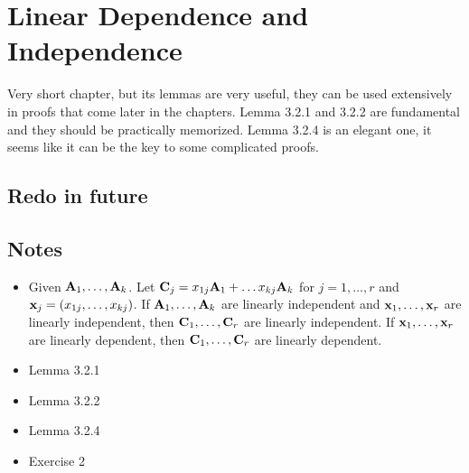 \documentclass[a4paper, oneside]{book}
\begin{document}
\chapter{Linear Dependence and Independence}
Very short chapter, but its lemmas are very useful, they can be used extensively in proofs that come later in the chapters. Lemma 3.2.1 and 3.2.2 are fundamental and they should be practically memorized. Lemma 3.2.4 is an elegant one, it seems like it can be the key to some complicated proofs. 

\section{Redo in future}


\section*{Notes}
\begin{itemize}
\item Given $\mathbf{A}_1,\hdots,\mathbf{A}_k$. Let $\mathbf{C}_j=x_{1j}\mathbf{A}_1+\hdots x_{kj}\mathbf{A}_k$ for $j=1,\hdots,r$ and $\mathbf{x}_j=(x_{1j}, \hdots, x_{kj})$. If  $\mathbf{A}_1,\hdots,\mathbf{A}_k$ are linearly independent and $\mathbf{x}_1, \hdots, \mathbf{x}_r$ are linearly independent, then $\mathbf{C}_1,\hdots,\mathbf{C}_r$ are linearly independent. If $\mathbf{x}_1, \hdots, \mathbf{x}_r$ are linearly dependent, then $\mathbf{C}_1,\hdots,\mathbf{C}_r$ are linearly dependent.
\end{itemize}


\begin{itemize}
\item Lemma 3.2.1
\item Lemma 3.2.2
\item Lemma 3.2.4
\item Exercise 2
\end{itemize}



\end{document}
